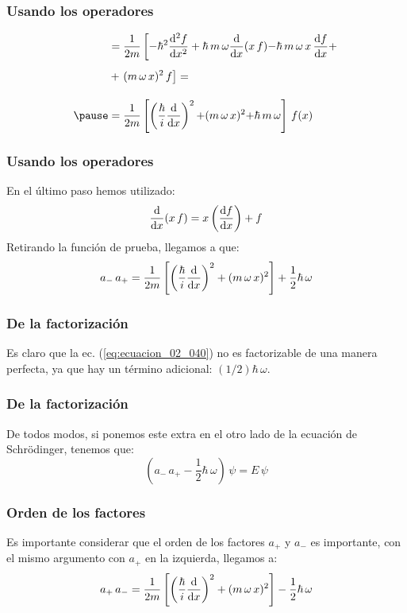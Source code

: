 \documentclass[12pt]{beamer}
\begin{document}
\begin{frame}
\frametitle{Usando los operadores}
\begin{eqnarray*}
\begin{aligned}
&= \dfrac{1}{2 m}  \left[ - \hbar^{2} \dv[2]{f}{x} + \hbar \, m \, \omega \dv{x} (x \, f) {-} \hbar \, m \, \omega \, x \, \dv{f}{x} + \right. \\[0.5em]
&+ \left. (m \, \omega \, x)^{2} \, f \right]  =\\[1em] \pause
&= \dfrac{1}{2 m} \left[ \left( \dfrac{\hbar}{i} \dv{x} \right)^{2} {+} (m \, \omega \, x)^{2} {+}\hbar \, m\, \omega \right] \, f(x)
\end{aligned}
\end{eqnarray*}
\end{frame}

\begin{frame}
\frametitle{Usando los operadores}
En el último paso hemos utilizado:
\pause
\begin{align*}
\dv{x} (x \, f) = x \left( \dv{f}{x} \right) + f
\end{align*}
\pause
Retirando la función de prueba, llegamos a que:
\pause
\begin{equation}
a_{-} \, a_{+} = \dfrac{1}{2 m} \left[ \left( \dfrac{\hbar}{i} \dv{x} \right)^{2} + (m \, \omega \, x)^{2} \right] + \dfrac{1}{2} \hbar \, \omega
\label{eq:ecuacion_02_042}
\end{equation}
\end{frame}
\begin{frame}
\frametitle{De la factorización}
Es claro que la ec. (\ref{eq:ecuacion_02_040}) no es factorizable de una manera perfecta, \pause ya que hay un término adicional: $(1/2) \hbar \, \omega$.
\end{frame}
\begin{frame}
\frametitle{De la factorización}
De todos modos, si ponemos este extra en el otro lado de la ecuación de Schrödinger, tenemos que:
\pause
\begin{equation}
(a_{-} \, a_{+} - \dfrac{1}{2} \hbar \, \omega) \, \psi = E \, \psi
\label{eq:ecuacion_02_43}
\end{equation}
\end{frame}
\begin{frame}
\frametitle{Orden de los factores}
Es importante considerar que el orden de los factores $a_{+}$ y $a_{-}$ es importante, con el mismo argumento con $a_{+}$ en la izquierda, llegamos a:
\pause
\begin{equation}
a_{+} \, a_{-} = \dfrac{1}{2 m} \left[ \left( \dfrac{\hbar}{i} \dv{x} \right)^{2} + (m \, \omega \, x)^{2} \right] - \dfrac{1}{2} \hbar \, \omega
\label{eq:ecuacion_02_044}
\end{equation}
\end{frame}
\end{document}
